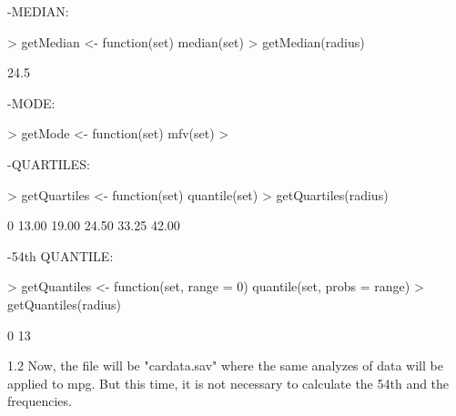 \documentclass[a4paper]{article}
\begin{document}
			-MEDIAN:
\begin{Schunk}
\begin{Sinput}
> getMedian    <- function(set) {median(set)}
> getMedian(radius)
\end{Sinput}
\begin{Soutput}
[1] 24.5
\end{Soutput}
\end{Schunk}
			-MODE:
\begin{Schunk}
\begin{Sinput}
> getMode      <- function(set) {mfv(set)}
> 
\end{Sinput}
\end{Schunk}
			-QUARTILES:
\begin{Schunk}
\begin{Sinput}
> getQuartiles <- function(set) {quantile(set)}
> getQuartiles(radius)
\end{Sinput}
\begin{Soutput}
   0%   25%   50%   75%  100% 
13.00 19.00 24.50 33.25 42.00 
\end{Soutput}
\end{Schunk}
			-54th QUANTILE:
\begin{Schunk}
\begin{Sinput}
> getQuantiles <- function(set, range = 0) {quantile(set, probs = range)}
> getQuantiles(radius)
\end{Sinput}
\begin{Soutput}
0% 
13 
\end{Soutput}
\end{Schunk}

	1.2 Now, the file will be "cardata.sav" where the same analyzes of data will be
	applied to mpg. But this time, it is not necessary to calculate the 54th and the
	frequencies.
	
\end{document}
